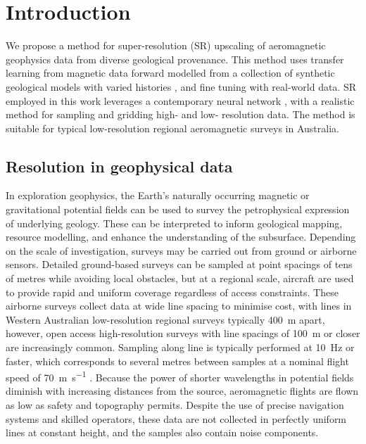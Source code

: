 \section{Introduction}
We propose a method for super-resolution (SR) upscaling of aeromagnetic geophysics data from diverse geological provenance.
This method uses transfer learning \parencite{tanSurveyDeepTransfer2018} from magnetic data forward modelled from a collection of synthetic geological models with varied histories \parencite{jessellNoddyverseMassiveData2022}, and fine tuning with real-world data.
SR employed in this work leverages a contemporary neural network \parencite{leeLocalTextureEstimator2022}, with a realistic method for sampling and gridding high- and low- resolution data.
The method is suitable for typical low-resolution regional aeromagnetic surveys in Australia.

\subsection{Resolution in geophysical data}
\label{sec:resinsurveys}
In exploration geophysics, the Earth's naturally occurring magnetic or gravitational potential fields can be used to survey the petrophysical expression of underlying geology.
These can be interpreted to inform geological mapping, resource modelling, and enhance the understanding of the subsurface.
Depending on the scale of investigation, surveys may be carried out from ground or airborne sensors.
Detailed ground-based surveys can be sampled at point spacings of tens of metres while avoiding local obstacles, but at a regional scale, aircraft are used to provide rapid and uniform coverage regardless of access constraints.
These airborne surveys collect data at wide line spacing to minimise cost, with lines in Western Australian low-resolution regional surveys typically \qty{400}{\m} apart, however, open access high-resolution surveys with line spacings of \qty{100}{\m} or closer are increasingly common.
Sampling along line is typically performed at \qty{10}{\Hz} or faster, which corresponds to several metres between samples at a nominal flight speed of \qty{70}{\m\per\s} \parencite{goodwinAirborneMagneticRadiometric2023}.
Because the power of shorter wavelengths in potential fields diminish with increasing distances from the source, aeromagnetic flights are flown as low as safety and topography permits.
Despite the use of precise navigation systems and skilled operators, these data are not collected in perfectly uniform lines at constant height, and the samples also contain noise components.

